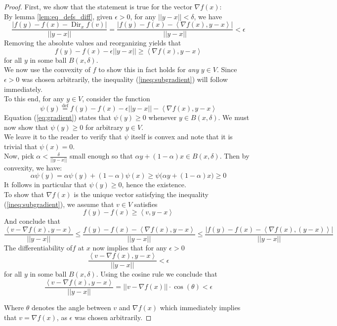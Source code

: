 \documentclass{book}
\theoremstyle{plain}
\theoremstyle{definition}
\newcommand{\bl}[2]{\left\langle #1,#2\right\rangle}
\DeclareMathOperator{\Dir}{Dir}
\newcommand{\define}{\stackrel{\operatorname{def}}{=}}
\begin{document}
\begin{proof}
\noindent First, we show that the statement is true for the vector $\nabla f(x)$:\\
By lemma \ref{lem:eq_defs_diff}, given $\epsilon>0$, for any $\vert \vert y-x \vert \vert <\delta $, we have
\[
\frac{\vert f(y)-f(x)-\Dir_x f(v) \vert }{\vert\vert y-x\vert\vert}= \frac{\vert f(y)-f(x)- \bl{\nabla f(x)}{y-x} \vert }{\vert\vert y-x\vert\vert}<\epsilon
\]
Removing the absolute values and reorganizing yields that
\[
f(y)-f(x)-\epsilon\vert \vert y-x\vert \vert \ge \bl{\nabla f(x)}{y-x}
\]
for all $y$ in some ball $B(x,\delta)$.\\
 We  now use the convexity of $f$ to show this in fact holds for \emph{any} $y \in V$. Since $\epsilon >0$ was chosen arbitrarily, the inequality (\ref{ineq:subgradient}) will follow immediately. \\
To this end, for any $y \in V$, consider the function
\begin{equation}\label{eq:gradient}
\psi(y)\define  f(y)-f(x)-\epsilon\vert\vert y-x\vert \vert - \bl{\nabla f(x)}{y-x}
\end{equation}
Equation (\ref{eq:gradient}) states that $\psi(y)\ge 0$ whenever $y \in B(x,\delta)$. We must now show that $\psi (y)\ge 0$ for arbitrary $y \in V$.\\
We leave it to the reader to verify that $\psi$ itself is convex and note that it is trivial that $\psi(x)=0$.\\ 
Now, pick $\alpha< \frac{\delta}{\vert \vert y-x\vert \vert }$ small enough so that $\alpha y+(1-\alpha )x \in B(x,\delta)$. Then by convexity, we have:
\[
\alpha \psi(y)=\alpha \psi(y)+(1-\alpha)\psi(x)\ge \psi\big(\alpha y+(1-\alpha)x\big)\ge 0
\]
It follows in particular that $\psi(y)\ge 0$, hence the existence.\\
To show that $\nabla f(x)$ is the unique vector satisfying the inequality (\ref{ineq:subgradient}), we assume  that $v \in V$ satisfies
\[
f(y)-f(x)\ge \bl{v}{ y-x}
\]
And conclude that
\[
\frac{\bl{ v-\nabla f(x)}{y-x} }{\vert \vert y-x \vert\vert }\le \frac{f(y)-f(x)-\bl{\nabla f(x)}{y-x} }{\vert \vert y-x \vert\vert }\le \frac{\vert f(y)-f(x)-\bl{\nabla f(x)}{(y-x)}\vert }{\vert \vert y-x\vert \vert}
\]
The differentiability of$f$ at $x$ now implies that for any $\epsilon>0$
\[
\frac{\bl{ v-\nabla f(x)}{y-x} }{\vert \vert y-x \vert\vert }<\epsilon
\]
for all $y$ in some ball $B(x,\delta)$. Using the cosine rule we conclude  that \[\frac{\bl{ v-\nabla f(x)}{y-x}}{\vert \vert y-x\vert \vert}=\vert \vert v-\nabla f(x)\vert \vert  \cdot \cos(\theta)<\epsilon\]

Where $\theta$ denotes the angle between $v$ and $\nabla f(x)$ which immediately implies that $v=\nabla f(x)$, as $\epsilon$ was chosen arbitrarily.
\end{proof}
\end{document}
